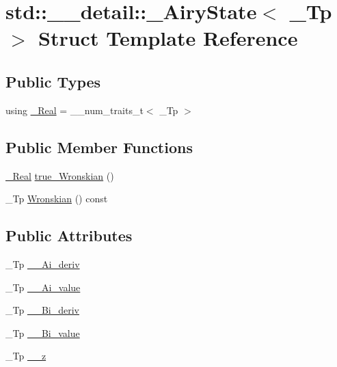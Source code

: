 \hypertarget{structstd_1_1____detail_1_1__AiryState}{}\section{std\+:\+:\+\_\+\+\_\+detail\+:\+:\+\_\+\+Airy\+State$<$ \+\_\+\+Tp $>$ Struct Template Reference}
\label{structstd_1_1____detail_1_1__AiryState}
\subsection*{Public Types}
\begin{DoxyCompactItemize}
\item 
using \hyperlink{structstd_1_1____detail_1_1__AiryState_ac18d07c685cbffed6173532d5f0c0cc9}{\+\_\+\+Real} = \+\_\+\+\_\+num\+\_\+traits\+\_\+t$<$ \+\_\+\+Tp $>$
\end{DoxyCompactItemize}
\subsection*{Public Member Functions}
\begin{DoxyCompactItemize}
\item 
\hyperlink{structstd_1_1____detail_1_1__AiryState_ac18d07c685cbffed6173532d5f0c0cc9}{\+\_\+\+Real} \hyperlink{structstd_1_1____detail_1_1__AiryState_a6c519145b38f24b2dab705fbc23f49d6}{true\+\_\+\+Wronskian} ()
\item 
\+\_\+\+Tp \hyperlink{structstd_1_1____detail_1_1__AiryState_a565f891531681d918aa85320ad776428}{Wronskian} () const
\end{DoxyCompactItemize}
\subsection*{Public Attributes}
\begin{DoxyCompactItemize}
\item 
\+\_\+\+Tp \hyperlink{structstd_1_1____detail_1_1__AiryState_a3d918b7b8cb09fd4bb57c10a5853c36f}{\+\_\+\+\_\+\+Ai\+\_\+deriv}
\item 
\+\_\+\+Tp \hyperlink{structstd_1_1____detail_1_1__AiryState_ad4a37f92020588e84a18fc1e93b02af6}{\+\_\+\+\_\+\+Ai\+\_\+value}
\item 
\+\_\+\+Tp \hyperlink{structstd_1_1____detail_1_1__AiryState_a0f80df510bae0d9a812fae2a20ac3c20}{\+\_\+\+\_\+\+Bi\+\_\+deriv}
\item 
\+\_\+\+Tp \hyperlink{structstd_1_1____detail_1_1__AiryState_a10ef7705b2b52a40502d75e62add672f}{\+\_\+\+\_\+\+Bi\+\_\+value}
\item 
\+\_\+\+Tp \hyperlink{structstd_1_1____detail_1_1__AiryState_a7606b501eba3f9b55aafa1706d7c9cc1}{\+\_\+\+\_\+z}
\end{DoxyCompactItemize}


